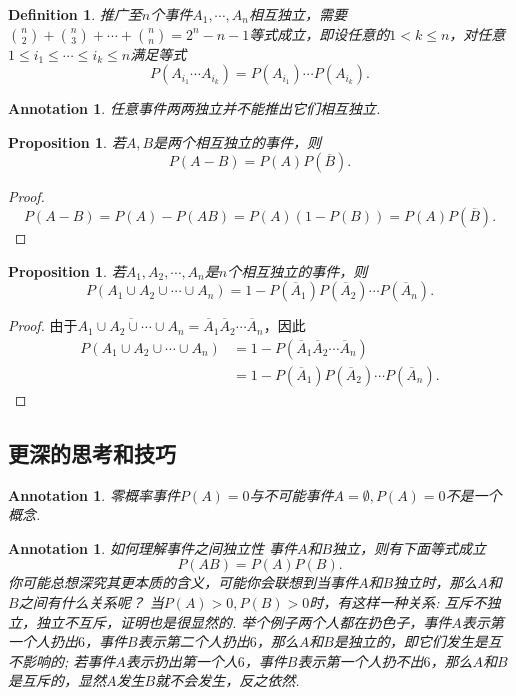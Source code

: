 \documentclass{article}
\newtheorem{proposition}[theorem]{Proposition}
\newtheorem{definition}[theorem]{Definition}
\newtheorem{annotation}[theorem]{Annotation}
\begin{document}
\begin{definition}
\rm 推广至$n$个事件$A_1,\cdots,A_n$相互独立，需要$\binom n2 + \binom n3 + \cdots + \binom nn = 2^n - n -1$等式成立，即设任意的$1<k \leq n$，对任意$1 \leq i_1 \leq \cdots \leq i_k \leq n$满足等式
$$
P(A_{i_1}\cdots A_{i_k})=P(A_{i_1})\cdots P(A_{i_k}).
$$
\end{definition}

\begin{annotation}
\rm {\color{blue}任意事件两两独立并不能推出它们相互独立}.
\end{annotation}

\begin{proposition}
\rm 若$A,B$是两个相互独立的事件，则
$$
P(A-B) = P(A)P(\overline{B}).
$$
\end{proposition}

\begin{proof}
\rm 
$$
P(A-B) = P(A)-P(AB) = P(A)(1-P(B)) = P(A)P(\overline{B}).
$$
\end{proof}

\begin{proposition}
\rm 若$A_1,A_2,\cdots,A_n$是$n$个相互独立的事件，则
$$
P(A_1 \cup A_2 \cup \cdots \cup A_n) = 1-P(\overline{A}_1)P(\overline{A}_2)\cdots P(\overline{A}_n). 
$$
\end{proposition}

\begin{proof}
由于$\overline{A_1\cup A_2 \cup \cdots \cup A_n} = \overline{A}_1\overline{A}_2\cdots\overline{A}_n$，因此
$$
\begin{array}{ll}
P(A_1 \cup A_2 \cup \cdots \cup A_n) &= 1-P(\overline{A}_1\overline{A}_2\cdots\overline{A}_n)\\
&= 1 - P(\overline{A}_1)P(\overline{A}_2)\cdots P(\overline{A}_n).
\end{array}
$$
\end{proof}



\newpage
\subsection{更深的思考和技巧}

\begin{annotation}
\rm {\color{red} 零概率事件$P(A) = 0$与不可能事件$A=\emptyset,P(A) = 0$不是一个概念}.
\end{annotation}


\begin{annotation}
\rm {\color{red} 如何理解事件之间独立性} 事件$A$和$B$独立，则有下面等式成立
$$
P(AB) = P(A)P(B). 
$$
你可能总想深究其更本质的含义，可能你会联想到当事件$A$和$B$独立时，那么$A$和$B$之间有什么关系呢？ 当$P(A)>0, P(B) > 0$时，有这样一种关系: {\color{red} 互斥不独立，独立不互斥}，证明也是很显然的. 举个例子两个人都在扔色子，事件$A$表示第一个人扔出$6$，事件$B$表示第二个人扔出$6$，那么$A$和$B$是独立的，即它们发生是互不影响的; 若事件$A$表示扔出第一个人$6$，事件$B$表示第一个人扔不出$6$，那么$A$和$B$是互斥的，显然$A$发生$B$就不会发生，反之依然.
\end{annotation}
\end{document}
